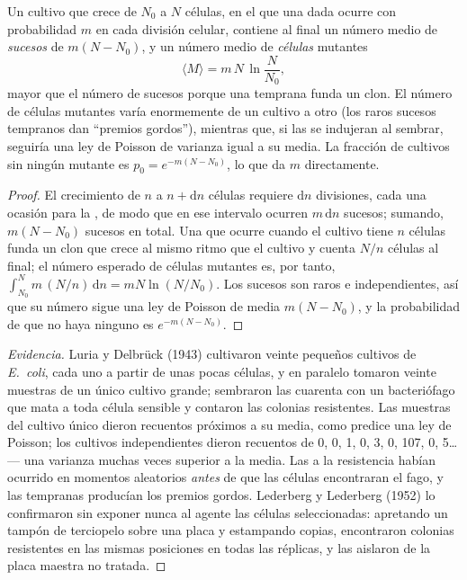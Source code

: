 \begin{theorem}\label{thm:b2:genome-diversification:luria}
Un cultivo que crece de $N_0$ a $N$ células, en el que una  dada
ocurre con probabilidad $m$ en cada división celular, contiene al final
un número medio de \emph{sucesos} de  $m(N - N_0)$, y un número
medio de \emph{células} mutantes
\[
\langle M\rangle = m\,N\,\ln\frac{N}{N_0},
\]
mayor que el número de sucesos porque una  temprana funda un
clon. El número de células mutantes varía enormemente de un cultivo a
otro (los raros sucesos tempranos dan ``premios gordos''), mientras que,
si las  se indujeran al sembrar, seguiría una ley de Poisson
de varianza igual a su media. La fracción de cultivos sin ningún
mutante es $p_0 = e^{-m(N - N_0)}$, lo que da $m$ directamente.
\end{theorem}
\begin{proof}
El crecimiento de $n$ a $n + \mathrm{d}n$ células requiere $\mathrm{d}n$
divisiones, cada una ocasión para la , de modo que en ese
intervalo ocurren $m\,\mathrm{d}n$ sucesos; sumando, $m(N - N_0)$ sucesos
en total. Una  que ocurre cuando el cultivo tiene $n$ células
funda un clon que crece al mismo ritmo que el cultivo y cuenta $N/n$
células al final; el número esperado de células mutantes es, por tanto,
$\int_{N_0}^{N} m\,(N/n)\,\mathrm{d}n = mN\ln(N/N_0)$. Los sucesos
son raros e independientes, así que su número sigue una ley de Poisson
de media $m(N - N_0)$, y la probabilidad de que no haya ninguno es
$e^{-m(N - N_0)}$.
\end{proof}
\begin{proof}[Evidencia]
Luria y Delbrück (1943) cultivaron veinte pequeños cultivos de
\emph{E.~coli}, cada uno a partir de unas pocas células, y en paralelo
tomaron veinte muestras de un único cultivo grande; sembraron las
cuarenta con un bacteriófago que mata a toda célula sensible y contaron
las colonias resistentes. Las muestras del cultivo único dieron recuentos
próximos a su media, como predice una ley de Poisson; los cultivos
independientes dieron recuentos de 0, 0, 1, 0, 3, 0, 107, 0, 5\dots{}
--- una varianza muchas veces superior a la media. Las  a la
resistencia habían ocurrido en momentos aleatorios \emph{antes} de que
las células encontraran el fago, y las tempranas producían los premios
gordos. Lederberg y Lederberg (1952) lo confirmaron sin exponer nunca al
agente las células seleccionadas: apretando un tampón de terciopelo sobre
una placa y estampando copias, encontraron colonias resistentes en las
mismas posiciones en todas las réplicas, y las aislaron de la placa
maestra no tratada.
\end{proof}

